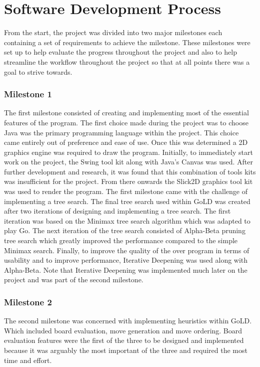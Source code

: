 \documentclass{l4proj}
\begin{document}
\section{Software Development Process}
From the start, the project was divided into two major milestones each containing a set of requirements to achieve the milestone. These milestones were set up to help evaluate the progress throughout the project and also to help streamline the workflow throughout the project so that at all points there was a goal to strive towards.

\subsubsection{Milestone 1}
The first milestone consisted of creating and implementing most of the essential features of the program. The first choice made during the project was to choose Java was the primary programming language within the project. This choice came entirely out of preference and ease of use. Once this was determined a 2D graphics engine was required to draw the program. Initially, to immediately start work on the project, the Swing tool kit along with Java’s Canvas was used. After further development and research, it was found that this combination of tools kits was insufficient for the project. From there onwards the Slick2D \cite{SLICK2D} graphics tool kit was used to render the program.
The first milestone came with the challenge of implementing a tree search. The final tree search used within GoLD was created after two iterations of designing and implementing a tree search. The first iteration was based on the Minimax tree search algorithm which was adapted to play Go. The next iteration of the tree search consisted of Alpha-Beta pruning tree search which greatly improved the performance compared to the simple Minimax search. Finally, to improve the quality of the over program in terms of usability and to improve performance, Iterative Deepening was used along with Alpha-Beta. Note that Iterative Deepening was implemented much later on the project and was part of the second milestone.

\subsubsection{Milestone 2}
The second milestone was concerned with implementing heuristics within GoLD. Which  included board evaluation, move generation and move ordering. Board evaluation features were the first of the three to be designed and implemented because it was arguably the most important of the three and required the most time and effort.
\end{document}
